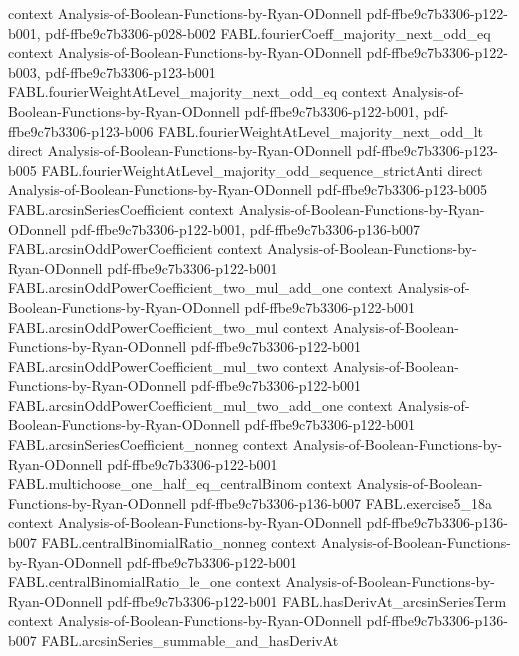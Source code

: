 \begin{theorem}
  {context}
  {Analysis-of-Boolean-Functions-by-Ryan-ODonnell}
  {pdf-ffbe9c7b3306-p122-b001,
    pdf-ffbe9c7b3306-p028-b002}
\proofstep
  {FABL.fourierCoeff_majority_next_odd_eq}
  {context}
  {Analysis-of-Boolean-Functions-by-Ryan-ODonnell}
  {pdf-ffbe9c7b3306-p122-b003,
    pdf-ffbe9c7b3306-p123-b001}
\proofstep
  {FABL.fourierWeightAtLevel_majority_next_odd_eq}
  {context}
  {Analysis-of-Boolean-Functions-by-Ryan-ODonnell}
  {pdf-ffbe9c7b3306-p122-b001,
    pdf-ffbe9c7b3306-p123-b006}
\proofstep
  {FABL.fourierWeightAtLevel_majority_next_odd_lt}
  {direct}
  {Analysis-of-Boolean-Functions-by-Ryan-ODonnell}
  {pdf-ffbe9c7b3306-p123-b005}
\proofstep
  {FABL.fourierWeightAtLevel_majority_odd_sequence_strictAnti}
  {direct}
  {Analysis-of-Boolean-Functions-by-Ryan-ODonnell}
  {pdf-ffbe9c7b3306-p123-b005}
\proofstep
  {FABL.arcsinSeriesCoefficient}
  {context}
  {Analysis-of-Boolean-Functions-by-Ryan-ODonnell}
  {pdf-ffbe9c7b3306-p122-b001,
    pdf-ffbe9c7b3306-p136-b007}
\proofstep
  {FABL.arcsinOddPowerCoefficient}
  {context}
  {Analysis-of-Boolean-Functions-by-Ryan-ODonnell}
  {pdf-ffbe9c7b3306-p122-b001}
\proofstep
  {FABL.arcsinOddPowerCoefficient_two_mul_add_one}
  {context}
  {Analysis-of-Boolean-Functions-by-Ryan-ODonnell}
  {pdf-ffbe9c7b3306-p122-b001}
\proofstep
  {FABL.arcsinOddPowerCoefficient_two_mul}
  {context}
  {Analysis-of-Boolean-Functions-by-Ryan-ODonnell}
  {pdf-ffbe9c7b3306-p122-b001}
\proofstep
  {FABL.arcsinOddPowerCoefficient_mul_two}
  {context}
  {Analysis-of-Boolean-Functions-by-Ryan-ODonnell}
  {pdf-ffbe9c7b3306-p122-b001}
\proofstep
  {FABL.arcsinOddPowerCoefficient_mul_two_add_one}
  {context}
  {Analysis-of-Boolean-Functions-by-Ryan-ODonnell}
  {pdf-ffbe9c7b3306-p122-b001}
\proofstep
  {FABL.arcsinSeriesCoefficient_nonneg}
  {context}
  {Analysis-of-Boolean-Functions-by-Ryan-ODonnell}
  {pdf-ffbe9c7b3306-p122-b001}
\proofstep
  {FABL.multichoose_one_half_eq_centralBinom}
  {context}
  {Analysis-of-Boolean-Functions-by-Ryan-ODonnell}
  {pdf-ffbe9c7b3306-p136-b007}
\proofstep
  {FABL.exercise5_18a}
  {context}
  {Analysis-of-Boolean-Functions-by-Ryan-ODonnell}
  {pdf-ffbe9c7b3306-p136-b007}
\proofstep
  {FABL.centralBinomialRatio_nonneg}
  {context}
  {Analysis-of-Boolean-Functions-by-Ryan-ODonnell}
  {pdf-ffbe9c7b3306-p122-b001}
\proofstep
  {FABL.centralBinomialRatio_le_one}
  {context}
  {Analysis-of-Boolean-Functions-by-Ryan-ODonnell}
  {pdf-ffbe9c7b3306-p122-b001}
\proofstep
  {FABL.hasDerivAt_arcsinSeriesTerm}
  {context}
  {Analysis-of-Boolean-Functions-by-Ryan-ODonnell}
  {pdf-ffbe9c7b3306-p136-b007}
\proofstep
  {FABL.arcsinSeries_summable_and_hasDerivAt}

\end{theorem}
